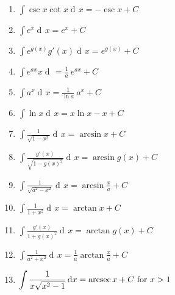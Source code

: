 \documentclass{article}
\DeclareMathOperator{\arcsec}{arcsec}
\newcommand{\dee}{\mathop{\mathrm{d}\!}}
\begin{document}
\begin{multicols*}{2}
\begin{enumerate}
        \item $\displaystyle \int \csc x\cot x \dee x = -\csc x+C$
        \item $\displaystyle \int e^x \dee x = e^x+C$
        \item $\displaystyle \int e^{g(x)}g'(x) \dee x = e^{g(x)}+C$
        \item $\displaystyle \int e^{ax} x \dee = \frac{1}{a}\ e^{ax}+C$
        \item $\displaystyle \int a^x \dee x = \frac{1}{\ln a}\ a^x+C$
        \item $\displaystyle \int \ln x \dee x = x\ln x -x+C$
        \item $\displaystyle \int \frac{1}{\sqrt{1-x^2}} \dee x = \arcsin x+C$
        \item $\displaystyle \int \frac{g'(x)}{\sqrt{1-g(x)^2}} \dee x = \arcsin g(x)+C$
        \item $\displaystyle \int \frac{1}{\sqrt{a^2-x^2}} \dee x = \arcsin \frac{x}{a}+C$
        \item $\displaystyle \int \frac{1}{1+x^2} \dee x = \arctan x+C$
        \item $\displaystyle \int \frac{g'(x)}{1+g(x)^2} \dee x = \arctan g(x)+C$
        \item $\displaystyle \int \frac{1}{a^2+x^2} \dee x = \frac{1}{a}\arctan \frac{x}{a}+C$
        \item $\displaystyle \int \frac{1}{x\sqrt{x^2-1}} \dee x = \arcsec x+C\hbox{ for }x > 1$
    \end{enumerate}
\end{multicols*}
\end{document}
